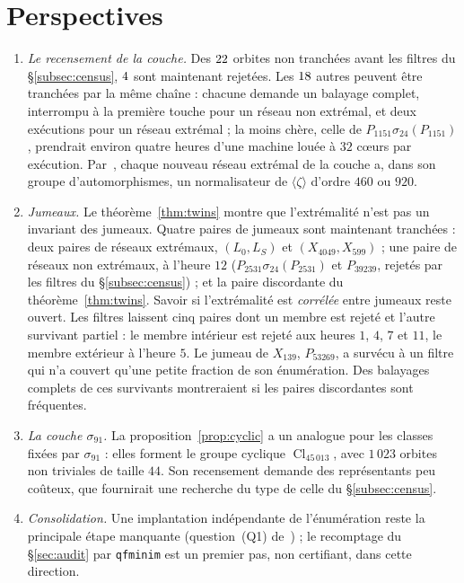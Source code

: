 \documentclass[11pt,a4paper]{amsart}
\theoremstyle{plain}
\theoremstyle{definition}
\DeclareMathOperator{\Cl}{Cl}
\newcommand{\Lz}{L_{0}}
\newcommand{\LS}{L_{S}}
\begin{document}
\section{Perspectives}\label{sec:outlook}
\begin{enumerate}[label=\textup{(\arabic*)}]
\item \emph{Le recensement de la couche.} Des $22$ orbites non tranchées avant les filtres du \S\ref{subsec:census}, $4$ sont maintenant rejetées. Les $18$ autres peuvent être tranchées par la même chaîne : chacune demande un balayage complet, interrompu à la première touche pour un réseau non extrémal, et deux exécutions pour un réseau extrémal ; la moins chère, celle de $P_{1151}\sigma_{24}(P_{1151})$, prendrait environ quatre heures d'une machine louée à $32$ cœurs par exécution. Par~\cite[rem.~2.6]{Gau26}, chaque nouveau réseau extrémal de la couche a, dans son groupe d'automorphismes, un normalisateur de $\langle\zeta\rangle$ d'ordre $460$ ou $920$.
\item \emph{Jumeaux.} Le théorème~\ref{thm:twins} montre que l'extrémalité n'est pas un invariant des jumeaux. Quatre paires de jumeaux sont maintenant tranchées : deux paires de réseaux extrémaux, $(\Lz,\LS)$ et $(X_{4049},X_{599})$ ; une paire de réseaux non extrémaux, à l'heure $12$ ($P_{2531}\sigma_{24}(P_{2531})$ et $P_{39239}$, rejetés par les filtres du \S\ref{subsec:census}) ; et la paire discordante du théorème~\ref{thm:twins}. Savoir si l'extrémalité est \emph{corrélée} entre jumeaux reste ouvert. Les filtres laissent cinq paires dont un membre est rejeté et l'autre survivant partiel : le membre intérieur est rejeté aux heures $1$, $4$, $7$ et $11$, le membre extérieur à l'heure $5$. Le jumeau de $X_{139}$, $P_{53269}$, a survécu à un filtre qui n'a couvert qu'une petite fraction de son énumération. Des balayages complets de ces survivants montreraient si les paires discordantes sont fréquentes.
\item \emph{La couche $\sigma_{91}$.} La proposition~\ref{prop:cyclic} a un analogue pour les classes fixées par $\sigma_{91}$ : elles forment le groupe cyclique $\Cl_{45\,013}$, avec $1\,023$ orbites non triviales de taille $44$. Son recensement demande des représentants peu coûteux, que fournirait une recherche du type de celle du \S\ref{subsec:census}.
\item \emph{Consolidation.} Une implantation indépendante de l'énumération reste la principale étape manquante (question~(Q1) de~\cite{Gau26}) ; le recomptage du \S\ref{sec:audit} par \texttt{qfminim} est un premier pas, non certifiant, dans cette direction.
\end{enumerate}
\end{document}
